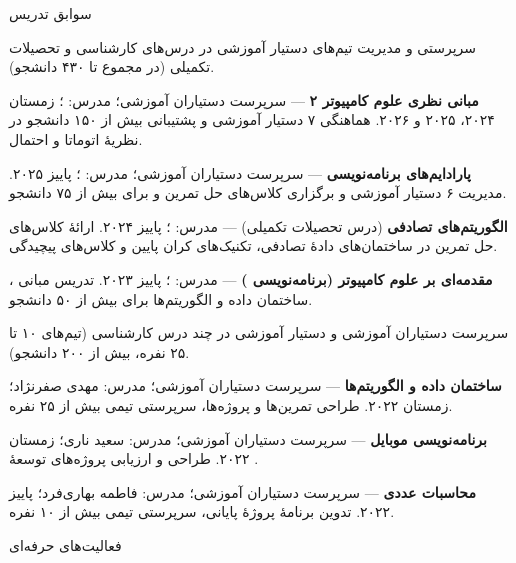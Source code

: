 \documentclass[11pt]{article}
\begin{document}
\begin{faSection}{سوابق تدریس}

سرپرستی و مدیریت تیم‌های دستیار آموزشی در درس‌های کارشناسی و تحصیلات تکمیلی (در مجموع تا ۴۳۰ دانشجو).
\begin{faItems}
  \item \textbf{مبانی نظری علوم کامپیوتر ۲} --- سرپرست دستیاران آموزشی؛ مدرس: ؛ زمستان ۲۰۲۴، ۲۰۲۵ و ۲۰۲۶. هماهنگی ۷ دستیار آموزشی و پشتیبانی بیش از ۱۵۰ دانشجو در نظریۀ اتوماتا و احتمال.
  \item \textbf{پارادایم‌های برنامه‌نویسی} --- سرپرست دستیاران آموزشی؛ مدرس: ؛ پاییز ۲۰۲۵. مدیریت ۶ دستیار آموزشی و برگزاری کلاس‌های حل تمرین  و  برای بیش از ۷۵ دانشجو.
  \item \textbf{الگوریتم‌های تصادفی} (درس تحصیلات تکمیلی) --- مدرس: ؛ پاییز ۲۰۲۴. ارائۀ کلاس‌های حل تمرین در ساختمان‌های دادۀ تصادفی، تکنیک‌های کران پایین و کلاس‌های پیچیدگی.
  \item \textbf{مقدمه‌ای بر علوم کامپیوتر (برنامه‌نویسی )} --- مدرس: ؛ پاییز ۲۰۲۳. تدریس مبانی ، ساختمان داده و الگوریتم‌ها برای بیش از ۵۰ دانشجو.
\end{faItems}

سرپرست دستیاران آموزشی و دستیار آموزشی در چند درس کارشناسی (تیم‌های ۱۰ تا ۲۵ نفره، بیش از ۲۰۰ دانشجو).
\begin{faItems}
  \item \textbf{ساختمان داده و الگوریتم‌ها} --- سرپرست دستیاران آموزشی؛ مدرس: مهدی صفرنژاد؛ زمستان ۲۰۲۲. طراحی تمرین‌ها و پروژه‌ها، سرپرستی تیمی بیش از ۲۵ نفره.
  \item \textbf{برنامه‌نویسی موبایل} --- سرپرست دستیاران آموزشی؛ مدرس: سعید ناری؛ زمستان ۲۰۲۲. طراحی و ارزیابی پروژه‌های توسعۀ .
  \item \textbf{محاسبات عددی} --- سرپرست دستیاران آموزشی؛ مدرس: فاطمه بهاری‌فرد؛ پاییز ۲۰۲۲. تدوین برنامۀ پروژۀ پایانی، سرپرستی تیمی بیش از ۱۰ نفره.
\end{faItems}

\end{faSection}

\begin{faSection}{فعالیت‌های حرفه‌ای}
\end{faSection}
\end{document}
